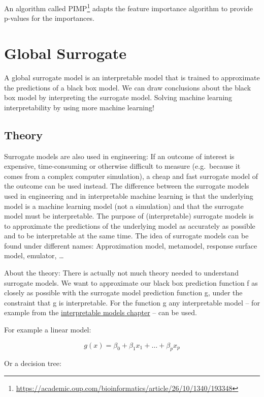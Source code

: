 \documentclass[12pt,]{krantz}
\renewcommand{\href}[2]{#2\footnote{\url{#1}}}
\begin{document}
An algorithm called
\href{https://academic.oup.com/bioinformatics/article/26/10/1340/193348}{PIMP}
adapts the feature importance algorithm to provide p-values for the
importances.

\newpage

\hypertarget{global}{\section{Global Surrogate}\label{global}}

A global surrogate model is an interpretable model that is trained to
approximate the predictions of a black box model. We can draw
conclusions about the black box model by interpreting the surrogate
model. Solving machine learning interpretability by using more machine
learning!

\subsection{Theory}\label{theory-4}

Surrogate models are also used in engineering: If an outcome of interest
is expensive, time-consuming or otherwise difficult to measure
(e.g.~because it comes from a complex computer simulation), a cheap and
fast surrogate model of the outcome can be used instead. The difference
between the surrogate models used in engineering and in interpretable
machine learning is that the underlying model is a machine learning
model (not a simulation) and that the surrogate model must be
interpretable. The purpose of (interpretable) surrogate models is to
approximate the predictions of the underlying model as accurately as
possible and to be interpretable at the same time. The idea of surrogate
models can be found under different names: Approximation model,
metamodel, response surface model, emulator, \ldots{}

About the theory: There is actually not much theory needed to understand
surrogate models. We want to approximate our black box prediction
function f as closely as possible with the surrogate model prediction
function g, under the constraint that g is interpretable. For the
function g any interpretable model -- for example from the
\protect\hyperlink{simple}{interpretable models chapter} -- can be used.

For example a linear model:

\[g(x)=\beta_0+\beta_1{}x_1{}+\ldots+\beta_p{}x_p\]

Or a decision tree:
\end{document}
